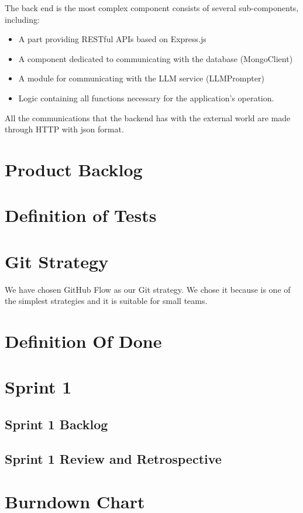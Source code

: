 \documentclass{article}
\begin{document}
The back end is the most complex component consists of several sub-components, including:
\begin{itemize}
    \item A part providing RESTful APIs based on Express.js
    \item A component dedicated to communicating with the database (MongoClient)
    \item A module for communicating with the LLM service (LLMPrompter)
    \item Logic containing all functions necessary for the application's operation.
\end{itemize}
All the communications that the backend has with the external world are made through HTTP with json format.

\section{Product Backlog}

\section{Definition of Tests}

\section{Git Strategy}

We have chosen GitHub Flow as our Git strategy.
We chose it because is one of the simplest strategies and it is suitable for small teams. 

\section{Definition Of Done}

\section{Sprint 1}

\subsection{Sprint 1 Backlog}

\subsection{Sprint 1 Review and Retrospective}

\section{Burndown Chart}
\end{document}
